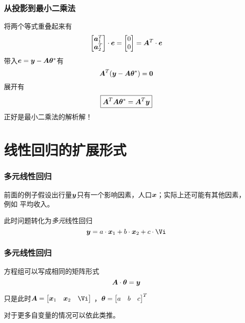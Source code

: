 \documentclass[14pt]{beamer}
\begin{document}
    \begin{frame}
        \frametitle{从投影到最小二乘法}
        将两个等式重叠起来有
        \begin{equation}
            \begin{bmatrix}
                \Va_1^T\\
                \Va_2^T
            \end{bmatrix}\cdot
            \Ve=\begin{bmatrix}
                0\\
                0
            \end{bmatrix}=
            \MA^T\cdot \Ve
        \end{equation}
        带入$\bm{e}=\bm{y}-\bm{A}\bm{\theta}^*$有
        \begin{equation}
            \bm{A}^T(\bm{y}-\bm{A}\bm{\theta}^*)=\bm{0}
        \end{equation}
        展开有
        \[ \boxed{\bm{A}^T\bm{A}\bm{\theta}^*=\bm{A}^T\bm{y}} \]
        正好是最小二乘法的解析解！
    \end{frame}

    \section{线性回归的扩展形式}

    \begin{frame}
        \frametitle{多元线性回归}
        前面的例子假设出行量$\bm{y}$只有一个影响因素，人口$\bm{x}$；实际上还可能有其他因素，例如
        平均收入。
        
        此时问题转化为\emph{多元}线性回归
        \begin{equation}
            \Vy = a\cdot\Vx_1+b\cdot\Vx_2+c\cdot\Vi
        \end{equation}
    \end{frame}

    \begin{frame}
        \frametitle{多元线性回归}
        方程组可以写成相同的矩阵形式
        \begin{equation}
            \bm{A}\cdot\bm{\theta}=\bm{y}
        \end{equation}
        
        只是此时$\MA=\begin{bmatrix}
                \Vx_1 & \Vx_2 & \Vi
            \end{bmatrix}$
            ，$\bm{\theta}=\begin{bmatrix}a&b&c\end{bmatrix}^T$

        对于更多自变量的情况可以依此类推。
    \end{frame}
\end{document}
